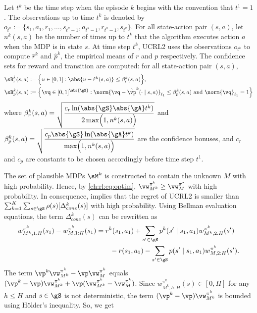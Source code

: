 Let $t^k$ be the time step when the episode $k$ begins with the convention that $t^1=1$.
The observations up to time $t^k$ is denoted by $o_{t^k}{:=}\{s_1,a_1,r_1,\dots,s_{t^k-1},a_{t^k-1},r_{t^k-1},s_{t^k}\}$.
For all state-action pair $(s,a)$, let $n^k(s,a)$ be the number of times up to $t^k$ that the algorithm executes action $a$ when the MDP is in state $s$.
At time step $t^k$, UCRL2 uses the observations $o_{t^k}$ to compute $\hat{r}^k$ and $\hat{p}^k$, the empirical means of $r$ and $p$ respectively.
The confidence sets for reward and transition are computed: for all state-action pair $(s,a)$,
\begin{align*}
    \sB_r^k(s,a)&:=\Bigl\{u\in[0,1] : \abs{u-\hat{r}^k(s,a)}\le\beta^k_r(s,a)\Bigr\}, \\
    \sB_p^k(s,a)&:=\Bigl\{\vq\in[0,1]^{\abs{\gS}}: \norm{\vq-\hat{\vp}^k(\cdot\mid s,a)}_{\ell_1}\le \beta^k_p(s,a)
    \text{ and }\norm{\vq}_{\ell_1}=1\Bigr\}
\end{align*}
where $\beta_r^k(s,a)=\displaystyle\sqrt{\frac{c_r\ln(\abs{\gS}\abs{\gA}t^k)}{2\max\Bigl(1,n^k(s,a)\Bigr)}}$ and $\beta_p^k(s,a)=\displaystyle\sqrt{\frac{c_p\abs{\gS}\ln(\abs{\gA}t^k)}{\max\Bigl(1,n^k(s,a)\Bigr)}}$ are the confidence bonuses, and $c_r$ and $c_p$ are constants to be chosen accordingly before time step $t^1$.

The set of plausible MDPs $\sM^k$ is constructed to contain the unknown $M$ with high probability.
Hence, by \eqref{ch:rl:eq:optim}, $\vw^{\pi^k}_{M^k}\ge \vw^{\pi^*}_M$ with high probability. 
In consequence,  implies that the regret of UCRL2 is smaller than ${\sum_{k=1}^K\sum_{s\in\gS}\rho(s)[\Delta_{conc}^k(s)]}$ with high probability.
Using Bellman evaluation equations, the term $\Delta_{conc}^k(s)$ can be rewritten as
\begin{align}
    w^{\pi^k}_{M^k,1:H}(s_1) -w^{\pi^k}_{M,1:H}(s_1)
    &= r^k(s_1,a_1)+\sum_{s'\in\gS}p^k(s'\mid s_1,a_1)w^{\pi^k}_{M^k,2:H}(s') \nonumber\\
    &\qquad -r(s_1,a_1)-\sum_{s'\in\gS}p(s'\mid s_1,a_1)w^{\pi^k}_{M,2:H}(s'). \label{eq:decom}
\end{align}
The term $\vp^k\vw^{\pi^k}_{M^k}-\vp\vw^{\pi^k}_M$ equals $(\vp^k-\vp)\vw^{\pi^k}_{M^k} +\vp(\vw^{\pi^k}_{M^k}-\vw^{\pi^k}_M)$.
Since $w^{\pi^k}_{M^k,h:H}(s)\in [0,H]$ for any $h\le H$ and $s\in\gS$ is not deterministic, the term $(\vp^k-\vp)\vw^{\pi^k}_{M^k}$ is bounded using Hölder's inequality.
So, we get


